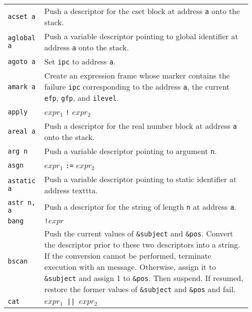 \begin{xtabular}{l@{\hspace{1.5cm}}p{13.5cm}}

\texttt{acset a} & Push a descriptor for the cset block at address
\texttt{a} onto the stack. \\

\texttt{aglobal a} & Push a variable descriptor pointing to global
identifier at address \texttt{a} onto the stack.\\

\texttt{agoto a} & Set \texttt{ipc} to address \texttt{a}.\\

\texttt{amark a}    & Create an expression frame whose marker contains
the failure
\texttt{ipc} corresponding to the address \texttt{a}, the current \texttt{efp},
\texttt{gfp}, and \texttt{ilevel}.\\

\texttt{apply}   & $expr_1$ \texttt{!} $expr_2$\\

\texttt{areal a} & Push a descriptor for the real number block at address
\texttt{a} onto the stack.\\

\texttt{arg n} & Push a variable descriptor pointing to argument \texttt{n}.\\

\texttt{asgn}  & $expr_1$ \texttt{:=} $expr_2$\\

\texttt{astatic a} & Push a variable descriptor pointing to static
identifier at address texttt{a}.\\

\texttt{astr n, a} & Push a descriptor for the string of length \texttt{n} 
at address \texttt{a}.\\

\texttt{bang}  & \texttt{!$expr$}\\

\texttt{bscan} & Push the current values of \texttt{\&subject} and
\texttt{\&pos}. Convert the descriptor prior to these two descriptors into a
string.  If the conversion cannot be performed, terminate execution with an
message. Otherwise, assign it to \texttt{\&subject} and assign 1 to
\texttt{\&pos}. Then suspend. If resumed, restore the former values of
\texttt{\&subject} and \texttt{\&pos} and fail.\\

\texttt{cat}   & \texttt{$expr_1$ || $expr_2$}\\


\end{xtabular}
